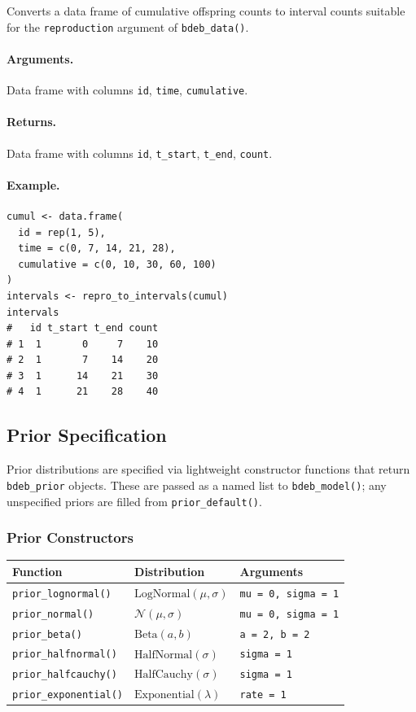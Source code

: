 \documentclass[11pt,a4paper]{article}
\newcommand{\fn}[1]{\texttt{#1()}}
\newcommand{\code}[1]{\texttt{#1}}
\begin{document}
Converts a data frame of cumulative offspring counts to interval counts
suitable for the \code{reproduction} argument of \fn{bdeb\_data}.

\paragraph{Arguments.}
\begin{description}[nosep,leftmargin=3cm]
  \item[\code{df}] Data frame with columns \code{id}, \code{time}, \code{cumulative}.
\end{description}

\paragraph{Returns.} Data frame with columns \code{id}, \code{t\_start}, \code{t\_end}, \code{count}.

\paragraph{Example.}
\begin{lstlisting}
cumul <- data.frame(
  id = rep(1, 5),
  time = c(0, 7, 14, 21, 28),
  cumulative = c(0, 10, 30, 60, 100)
)
intervals <- repro_to_intervals(cumul)
intervals
#   id t_start t_end count
# 1  1       0     7    10
# 2  1       7    14    20
# 3  1      14    21    30
# 4  1      21    28    40
\end{lstlisting}

\subsection{Prior Specification}
\label{sec:priors}

Prior distributions are specified via lightweight constructor functions
that return \code{bdeb\_prior} objects.  These are passed as a named list
to \fn{bdeb\_model}; any unspecified priors are filled from
\fn{prior\_default}.

\subsubsection{Prior Constructors}

\begin{longtable}{lll}
\toprule
\textbf{Function} & \textbf{Distribution} & \textbf{Arguments} \\
\midrule
\endhead
\fn{prior\_lognormal} & $\text{LogNormal}(\mu, \sigma)$ & \code{mu = 0, sigma = 1} \\
\fn{prior\_normal} & $\mathcal{N}(\mu, \sigma)$ & \code{mu = 0, sigma = 1} \\
\fn{prior\_beta} & $\text{Beta}(a, b)$ & \code{a = 2, b = 2} \\
\fn{prior\_halfnormal} & $\text{HalfNormal}(\sigma)$ & \code{sigma = 1} \\
\fn{prior\_halfcauchy} & $\text{HalfCauchy}(\sigma)$ & \code{sigma = 1} \\
\fn{prior\_exponential} & $\text{Exponential}(\lambda)$ & \code{rate = 1} \\
\bottomrule
\end{longtable}
\end{document}
